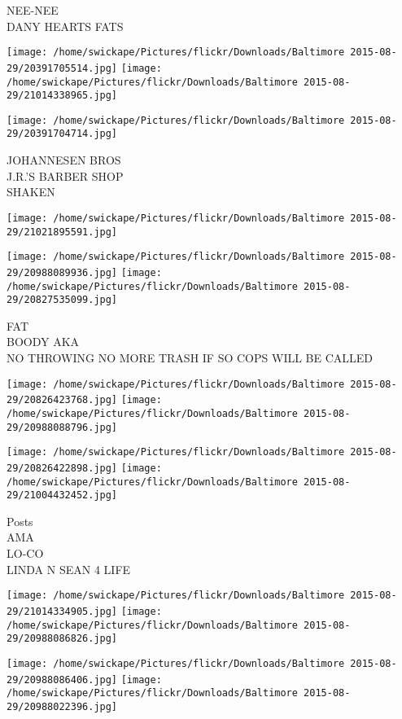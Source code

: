 \documentclass[10pt,letterpaper]{article}
\begin{document}
NEE{-}NEE\\
DANY HEARTS FATS
\pagebreak

\texttt{[image: /home/swickape/Pictures/flickr/Downloads/Baltimore 2015-08-29/20391705514.jpg]}
\texttt{[image: /home/swickape/Pictures/flickr/Downloads/Baltimore 2015-08-29/21014338965.jpg]}

\texttt{[image: /home/swickape/Pictures/flickr/Downloads/Baltimore 2015-08-29/20391704714.jpg]}

JOHANNESEN BROS\\
J.R.'S BARBER SHOP\\
SHAKEN
\pagebreak

\texttt{[image: /home/swickape/Pictures/flickr/Downloads/Baltimore 2015-08-29/21021895591.jpg]}

\vspace{0.25in}
\texttt{[image: /home/swickape/Pictures/flickr/Downloads/Baltimore 2015-08-29/20988089936.jpg]}
\texttt{[image: /home/swickape/Pictures/flickr/Downloads/Baltimore 2015-08-29/20827535099.jpg]}

FAT\\
BOODY AKA\\
NO THROWING NO MORE TRASH IF SO COPS WILL BE CALLED
\pagebreak

\texttt{[image: /home/swickape/Pictures/flickr/Downloads/Baltimore 2015-08-29/20826423768.jpg]}
\texttt{[image: /home/swickape/Pictures/flickr/Downloads/Baltimore 2015-08-29/20988088796.jpg]}

\texttt{[image: /home/swickape/Pictures/flickr/Downloads/Baltimore 2015-08-29/20826422898.jpg]}
\texttt{[image: /home/swickape/Pictures/flickr/Downloads/Baltimore 2015-08-29/21004432452.jpg]}

Posts\\
AMA\\
LO{-}CO\\
LINDA N SEAN 4 LIFE
\pagebreak

\texttt{[image: /home/swickape/Pictures/flickr/Downloads/Baltimore 2015-08-29/21014334905.jpg]}
\texttt{[image: /home/swickape/Pictures/flickr/Downloads/Baltimore 2015-08-29/20988086826.jpg]}

\texttt{[image: /home/swickape/Pictures/flickr/Downloads/Baltimore 2015-08-29/20988086406.jpg]}
\texttt{[image: /home/swickape/Pictures/flickr/Downloads/Baltimore 2015-08-29/20988022396.jpg]}
\end{document}
